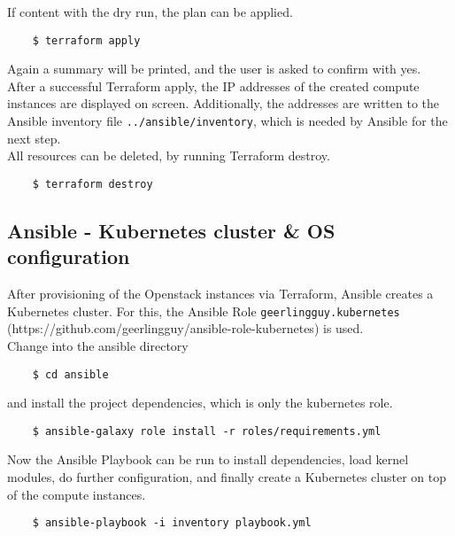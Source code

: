 \noindent
If content with the dry run, the plan can be applied.

\begin{verbatim}
	$ terraform apply
\end{verbatim}

\noindent
Again a summary will be printed, and the user is asked to confirm with yes. \\

\noindent
After a successful Terraform apply, the IP addresses of the created compute 
instances are displayed on screen. Additionally, the addresses are written
to the Ansible inventory file \verb|../ansible/inventory|,
which is needed by Ansible for the next step. \\

\noindent
All resources can be deleted, by running Terraform destroy.

\begin{verbatim}
	$ terraform destroy
\end{verbatim}

\subsection{Ansible - Kubernetes cluster \& OS configuration}
After provisioning of the Openstack instances via Terraform,
Ansible creates a Kubernetes cluster.
For this, the Ansible Role \verb|geerlingguy.kubernetes|
(https://github.com/geerlingguy/ansible-role-kubernetes) is used. \\

\noindent
Change into the ansible directory 

\begin{verbatim}
	$ cd ansible
\end{verbatim}

\noindent
and install the project dependencies,
which is only the kubernetes role.

\begin{verbatim}
	$ ansible-galaxy role install -r roles/requirements.yml
\end{verbatim}

\noindent
Now the Ansible Playbook can be run to install dependencies,
load kernel modules, do further configuration, and finally
create a Kubernetes cluster on top of the compute instances.

\begin{verbatim}
	$ ansible-playbook -i inventory playbook.yml
\end{verbatim}

